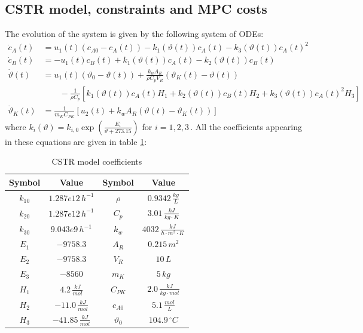 \documentclass[12pt]{article}
\begin{document}
\subsection*{CSTR model, constraints and MPC costs}\label{sec:cstr-model}
\noindent The evolution of the system is given by the following system of ODEs:
\begin{align*}
	\dot{c}_A(t)&=u_1(t)(c_{A0}-c_A(t))-k_1(\vartheta(t))c_A(t)-k_3(\vartheta(t))c_A(t)^2\\
	\dot{c}_B(t)&=-u_1(t)c_B(t)+k_1(\vartheta(t))c_A(t)-k_2(\vartheta(t))c_B(t)\\
	\dot{\vartheta}(t)&=u_1(t)(\vartheta_0-\vartheta(t))+\frac{k_wA_R}{\rho C_pV_R}(\vartheta_K(t)-\vartheta(t))\\
	&\qquad-\frac{1}{\rho C_p}\left[ k_1(\vartheta(t))c_A(t)H_1+k_2(\vartheta(t))c_B(t)H_2 +k_3(\vartheta(t))c_A(t)^2H_3\right]\\
	\dot{\vartheta}_K(t)&=\frac{1}{m_KC_{PK}}\left[ u_2(t)+k_wA_R(\vartheta(t)-\vartheta_K(t)) \right]
\end{align*}
where $k_i(\vartheta)=k_{i,0}\exp\left(\frac{E_i}{\vartheta+273.15}\right)$ for $i=1,2,3$\,.
All the coefficients appearing in these equations are given in table \ref{tab:cstr-model-coefficients}:
\begin{table}[H]
	\centering
	\begin{tabular}{|c|c||c|c|}
		\hline
		Symbol&Value&Symbol&Value\\
		\hline
		$k_{10}$ & $1.287e12\,h^{-1}$ & $\rho$ & $0.9342\,\frac{kg}{L}$\\
		$k_{20}$ & $1.287e12\,h^{-1}$ & $C_p$ & $3.01\,\frac{kJ}{kg\cdot K}$\\
		$k_{30}$ & $9.043e9\,h^{-1}$ & $k_w$ & $4032\,\frac{kJ}{h\cdot m^2\cdot K}$\\
		$E_{1}$ & $-9758.3$ & $A_R$ & $0.215\,m^2$\\
		$E_{2}$ & $-9758.3$ & $V_R$ & $10\,L$\\
		$E_{3}$ & $-8560$ & $m_K$ & $5\,kg$\\
		$H_{1}$ & $4.2\,\frac{kJ}{mol}$ & $C_{PK}$ & $2.0\,\frac{kJ}{kg\cdot mol}$\\
		$H_{2}$ & $-11.0\,\frac{kJ}{mol}$ & $c_{A0}$ & $5.1\,\frac{mol}{L}$\\
		$H_{3}$ & $-41.85\,\frac{kJ}{mol}$ & $\vartheta_0$ & $104.9\,^\circ C$\\
		\hline
	\end{tabular}
	\caption{CSTR model coefficients}
	\label{tab:cstr-model-coefficients}
\end{table}
\end{document}
